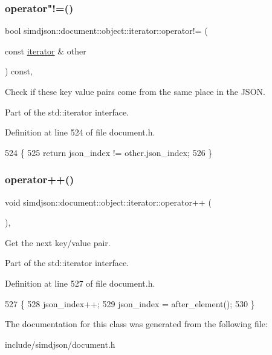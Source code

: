 \subsubsection{\texorpdfstring{operator"!=()}{operator!=()}}
{\footnotesize\ttfamily bool simdjson\+::document\+::object\+::iterator\+::operator!= (\begin{DoxyParamCaption}\item[{const \hyperlink{classsimdjson_1_1document_1_1object_1_1iterator}{iterator} \&}]{other }\end{DoxyParamCaption}) const\hspace{0.3cm}{\ttfamily [inline]}, {\ttfamily [noexcept]}}



Check if these key value pairs come from the same place in the J\+S\+ON. 

Part of the std\+::iterator interface. 

Definition at line 524 of file document.\+h.


\begin{DoxyCode}
524                                                                                                  \{
525   \textcolor{keywordflow}{return} json\_index != other.json\_index;
526 \}
\end{DoxyCode}
\mbox{\label{classsimdjson_1_1document_1_1object_1_1iterator_a1a97b083023759d347a0bf103a6c0d10}} 
\subsubsection{\texorpdfstring{operator++()}{operator++()}}
{\footnotesize\ttfamily void simdjson\+::document\+::object\+::iterator\+::operator++ (\begin{DoxyParamCaption}{ }\end{DoxyParamCaption})\hspace{0.3cm}{\ttfamily [inline]}, {\ttfamily [noexcept]}}



Get the next key/value pair. 

Part of the std\+::iterator interface. 

Definition at line 527 of file document.\+h.


\begin{DoxyCode}
527                                                         \{
528   json\_index++;
529   json\_index = after\_element();
530 \}
\end{DoxyCode}


The documentation for this class was generated from the following file\+:\begin{DoxyCompactItemize}
\item 
include/simdjson/document.\+h\end{DoxyCompactItemize}
